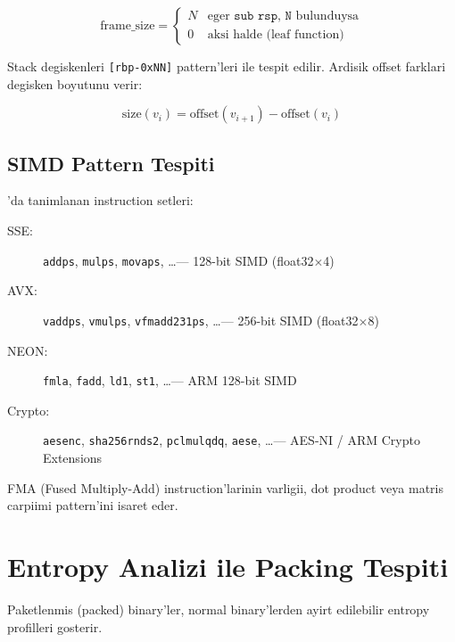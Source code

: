 \begin{equation}
\label{eq:stack-frame}
\text{frame\_size} =
\begin{cases}
N & \text{eger } \texttt{sub rsp, N} \text{ bulunduysa} \\
0 & \text{aksi halde (leaf function)}
\end{cases}
\end{equation}

Stack degiskenleri \texttt{[rbp-0xNN]} pattern'leri ile tespit edilir. Ardisik offset farklari degisken boyutunu verir:

\begin{equation}
\label{eq:stack-var-size}
\text{size}(v_i) = \text{offset}(v_{i+1}) - \text{offset}(v_i)
\end{equation}

\subsection{SIMD Pattern Tespiti}

'da tanimlanan instruction setleri:

\begin{description}
\item[SSE:] \texttt{addps}, \texttt{mulps}, \texttt{movaps}, \ldots --- 128-bit SIMD (float32$\times$4)
\item[AVX:] \texttt{vaddps}, \texttt{vmulps}, \texttt{vfmadd231ps}, \ldots --- 256-bit SIMD (float32$\times$8)
\item[NEON:] \texttt{fmla}, \texttt{fadd}, \texttt{ld1}, \texttt{st1}, \ldots --- ARM 128-bit SIMD
\item[Crypto:] \texttt{aesenc}, \texttt{sha256rnds2}, \texttt{pclmulqdq}, \texttt{aese}, \ldots --- AES-NI / ARM Crypto Extensions
\end{description}

FMA (Fused Multiply-Add) instruction'larinin varligii, dot product veya matris carpiimi pattern'ini isaret eder.


\section{Entropy Analizi ile Packing Tespiti}
\label{sec:entropy-packing}

Paketlenm\-is (packed) binary'ler, normal binary'lerden ayirt edilebilir entropy profilleri gosterir.

